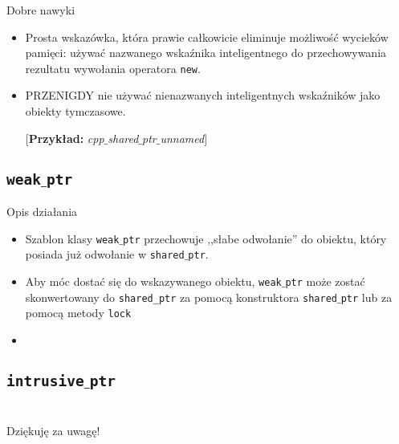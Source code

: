 \begin{frame}[t]{Dobre nawyki}
\footnotesize

\begin{itemize}
	\item Prosta wskazówka, która prawie całkowicie eliminuje możliwość
	  wycieków pamięci: używać nazwanego wskaźnika inteligentnego do 
	  przechowywania rezultatu wywołania operatora \texttt{new}.
	  
	\item PRZENIGDY nie używać nienazwanych inteligentnych wskaźników
	jako obiekty tymczasowe.
	
	$[$\textbf{Przykład: }\textit{cpp$\_$shared$\_$ptr$\_$unnamed}$]$
\end{itemize}

\end{frame}

\subsection{\texttt{weak$\_$ptr}}
\begin{frame}[t]{Opis działania}
	\footnotesize
	
	{
	  \begin{itemize}
	    \item Szablon klasy \texttt{weak$\_$ptr} przechowuje ,,słabe odwołanie''
	      do obiektu, który posiada już odwołanie w \texttt{shared$\_$ptr}.
	      \pause
	      
	    \item Aby móc  dostać się do wskazywanego obiektu,
	      \texttt{weak$\_$ptr} może zostać
	      skonwertowany do \texttt{shared\_ptr} za pomocą konstruktora 
	      \texttt{shared$\_$ptr} lub za pomocą metody \texttt{lock}
	      \pause
	    \item 
	  \end{itemize}
	}
\end{frame}

\subsection{\texttt{intrusive$\_$ptr}}

\section{}
\begin{frame}
  \begin{center}
    \huge
    Dziękuję za uwagę!
  \end{center}
 
  
\end{frame}


